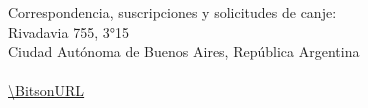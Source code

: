 %

{\scriptsize{}Correspondencia, suscripciones y solicitudes de canje:}\\
{\scriptsize{} Rivadavia 755, 3°15 }\\
{\scriptsize{} Ciudad Autónoma de Buenos Aires, República Argentina}\\
{\scriptsize{} \BitsonCoop}\\
{\scriptsize{} \url{\BitsonURL}}\\
{\scriptsize{} \texttt{\BitsonMail}}\\
{\scriptsize \par}

